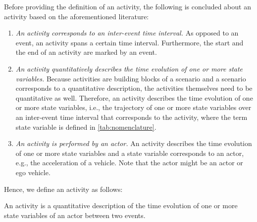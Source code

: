 Before providing the definition of an activity, the following is concluded about an activity based on the aforementioned literature:

\begin{enumerate}
	\item\textit{An activity corresponds to an inter-event time interval.}
	As opposed to an event, an activity spans a certain time interval. Furthermore, the start and the end of an activity are marked by an event.
	
	\item\textit{An activity quantitatively describes the time evolution of \cstarte one or more \cende state variables.}
	Because activities are building blocks of a scenario and a scenario corresponds to a quantitative description, the activities themselves need to be quantitative as well. 
	Therefore, an activity describes the time evolution of one or more state variables, i.e., the trajectory of one or more state variables over an inter-event time interval that corresponds to the activity, where the term state variable is defined in \cref{tab:nomenclature}.
	
	\item\textit{An activity is performed by an actor.}
	An activity describes the time evolution of one or more state variables and a state variable corresponds to an actor, e.g., the acceleration of a vehicle. Note that the actor might be an actor or ego vehicle. 
\end{enumerate}

Hence, we define an activity as follows:
\begin{definition}[Activity]
	\label{def:activity}
	An activity is a quantitative description of the time evolution of one or more state variables of an actor between two events.
\end{definition}



